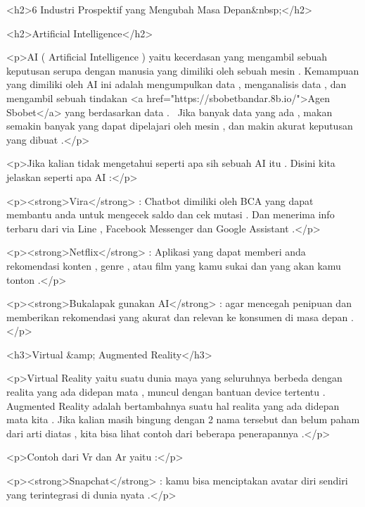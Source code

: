 <h2>6 Industri Prospektif yang Mengubah Masa Depan&nbsp;</h2>



<h2>Artificial Intelligence</h2>



<p>AI ( Artificial Intelligence ) yaitu kecerdasan yang mengambil sebuah keputusan serupa dengan manusia yang dimiliki oleh sebuah mesin . Kemampuan yang dimiliki oleh AI ini adalah mengumpulkan data , menganalisis data , dan mengambil sebuah tindakan <a href="https://sbobetbandar.8b.io/">Agen Sbobet</a> yang berdasarkan data .  Jika banyak data yang ada , makan semakin banyak yang dapat dipelajari oleh mesin , dan makin akurat keputusan yang dibuat .</p>



<p>Jika kalian tidak mengetahui seperti apa sih sebuah AI itu . Disini kita jelaskan seperti apa AI :</p>



<p><strong>Vira</strong> : Chatbot dimiliki oleh BCA yang dapat membantu anda untuk mengecek saldo dan cek mutasi . Dan menerima info terbaru dari via Line , Facebook Messenger dan Google Assistant .</p>



<p><strong>Netflix</strong> : Aplikasi yang dapat memberi anda rekomendasi konten , genre , atau film yang kamu sukai dan yang akan kamu tonton .</p>



<p><strong>Bukalapak gunakan AI</strong> : agar mencegah penipuan dan memberikan rekomendasi yang akurat dan relevan ke konsumen di masa depan .</p>



<h3>Virtual &amp; Augmented Reality</h3>



<p>Virtual Reality yaitu suatu dunia maya yang seluruhnya berbeda dengan realita yang ada didepan mata , muncul dengan bantuan device tertentu . Augmented Reality adalah bertambahnya suatu hal realita yang ada didepan mata kita . Jika kalian masih bingung dengan 2 nama tersebut dan belum paham dari arti diatas , kita bisa lihat contoh dari beberapa penerapannya .</p>



<p>Contoh dari Vr dan Ar yaitu :</p>



<p><strong>Snapchat</strong> : kamu bisa menciptakan avatar diri sendiri yang terintegrasi di dunia nyata .</p>



